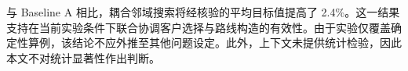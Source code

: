 与 Baseline A 相比，耦合邻域搜索将经核验的平均目标值提高了 2.4\%。这一结果支持在当前实验条件下联合协调客户选择与路线构造的有效性。由于实验仅覆盖确定性算例，该结论不应外推至其他问题设定。此外，上下文未提供统计检验，因此本文不对统计显著性作出判断。
